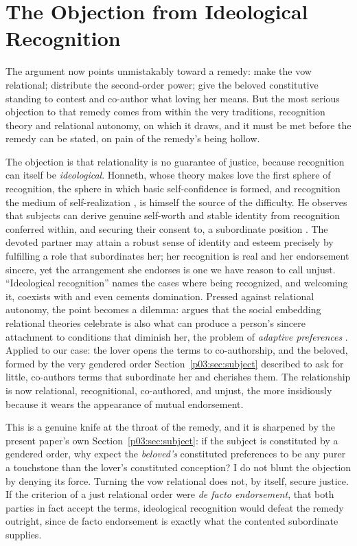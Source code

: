 \section{The Objection from Ideological Recognition}\label{p03:sec:ideology}

The argument now points unmistakably toward a remedy: make the vow relational; distribute the second-order power; give the beloved constitutive standing to contest and co-author what loving her means. But the most serious objection to that remedy comes from within the very traditions, recognition theory and relational autonomy, on which it draws, and it must be met before the remedy can be stated, on pain of the remedy's being hollow.

The objection is that relationality is no guarantee of justice, because recognition can itself be \emph{ideological}. Honneth, whose theory makes love the first sphere of recognition, the sphere in which basic self-confidence is formed, and recognition the medium of self-realization \parencite{honneth1995struggle}, is himself the source of the difficulty. He observes that subjects can derive genuine self-worth and stable identity from recognition conferred within, and securing their consent to, a subordinate position \parencite{honneth2007disrespect}. The devoted partner may attain a robust sense of identity and esteem precisely by fulfilling a role that subordinates her; her recognition is real and her endorsement sincere, yet the arrangement she endorses is one we have reason to call unjust. ``Ideological recognition'' names the cases where being recognized, and welcoming it, coexists with and even cements domination. Pressed against relational autonomy, the point becomes a dilemma: \textcite{khader2020feminist} argues that the social embedding relational theories celebrate is also what can produce a person's sincere attachment to conditions that diminish her, the problem of \emph{adaptive preferences} \parencite[cf.][]{khader2011adaptive}. Applied to our case: the lover opens the terms to co-authorship, and the beloved, formed by the very gendered order Section~\ref{p03:sec:subject} described to ask for little, co-authors terms that subordinate her and cherishes them. The relationship is now relational, recognitional, co-authored, and unjust, the more insidiously because it wears the appearance of mutual endorsement.

This is a genuine knife at the throat of the remedy, and it is sharpened by the present paper's own Section~\ref{p03:sec:subject}: if the subject is constituted by a gendered order, why expect the \emph{beloved's} constituted preferences to be any purer a touchstone than the lover's constituted conception? I do not blunt the objection by denying its force. Turning the vow relational does not, by itself, secure justice. If the criterion of a just relational order were \emph{de facto endorsement}, that both parties in fact accept the terms, ideological recognition would defeat the remedy outright, since de facto endorsement is exactly what the contented subordinate supplies.

